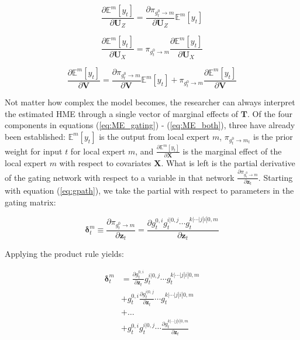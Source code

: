 \documentclass[12pt]{article}
\newcommand{\gateprod}[2]{\pi_{#1 \longrightarrow #2}}
\newcommand{\Eym}{\mathbb{E}^{m} \left[ y_{t} \right]}
\theoremstyle{definition}
\begin{document}
\begin{equation} \label{eq:ME_gating}
  \frac{\partial \Eym}{\partial \boldsymbol{U}_{Z}} = \frac{\partial \gateprod{g^{0}_{t}}{m}}{{\partial \boldsymbol{U}_{Z}}} \Eym
\end{equation}


\begin{equation} \label{eq:ME_expert}
  \frac{\partial \Eym}{\partial \boldsymbol{U}_{X}} = \gateprod{g^{0}_{t}}{m} \frac{\partial \Eym}{{\partial \boldsymbol{U}_{X}}}
\end{equation}


\begin{equation} \label{eq:ME_both}
  \frac{\partial \Eym}{\partial \boldsymbol{V}} = \frac{\partial \gateprod{g^{0}_{t}}{m}}{{\partial \boldsymbol{V}}} \Eym + \gateprod{g^{0}_{t}}{m} \frac{\partial \Eym}{{\partial \boldsymbol{V}}}
\end{equation}

Not matter how complex the model becomes, the researcher can always interpret the estimated HME through a single vector of marginal effects of $\boldsymbol{T}$. Of the four components in equations (\ref{eq:ME_gating}) - (\ref{eq:ME_both}), three have already been established: $\Eym$ is the output from local expert $m$, $\gateprod{g^{0}_{t}}{m_{t}}$ is the prior weight for input $t$ for local expert $m$, and $\frac{\partial \Eym}{{\partial \boldsymbol{X}}}$ is the marginal effect of the local expert $m$ with respect to covariates $\boldsymbol{X}$. What is left is the partial derivative of the gating network with respect to a variable in that network $\frac{\partial \gateprod{g^{0}_{t}}{m}}{\partial \boldsymbol{z}_{t}}$. Starting with equation (\ref{eq:gpath}), we take the partial with respect to parameters in the gating matrix:

\begin{equation} \label{eq:hme_gate_marginal_effect_1}
  \boldsymbol{\delta}^{m}_{t} \equiv \frac{\partial \gateprod{g^{0}_{t}}{m}}{\partial \boldsymbol{z}_{t}} = \frac{\partial g^{0, i}_{t} g^{i|0, j}_{t} \cdots g^{k|\cdots|j|i|0, m}_{t}}{\partial \boldsymbol{z}_{t}}
\end{equation}

Applying the product rule yields:

\begin{equation} \label{eq:hme_gate_marginal_effect_2}
  \begin{split}
    \boldsymbol{\delta}^{m}_{t} &= \frac{\partial g^{0, i}_{t}}{\partial \boldsymbol{z}_{t}} g^{i|0, j}_{t} \cdots g^{k|\cdots|j|i|0, m}_{t}                       \\
                                     &+ g^{0, i}_{t} \frac{\partial g^{i|0, j}_{t}}{\partial \boldsymbol{z}_{t}} \cdots g^{k|\cdots|j|i|0, m}_{t} \\
                                     &+ \dots                                                                                     \\
                                     &+ g^{0, i}_{t} g^{i|0, j}_{t} \cdots \frac{\partial g^{k|\cdots|j|i|0, m}_{t}}{\partial \boldsymbol{z}_{t}} \\
  \end{split}
\end{equation}
\end{document}
